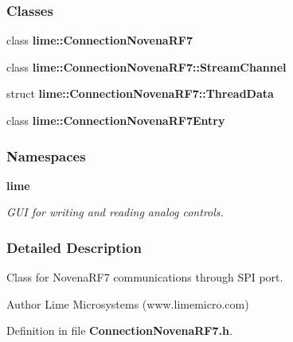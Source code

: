 \subsubsection*{Classes}
\begin{DoxyCompactItemize}
\item 
class {\bf lime\+::\+Connection\+Novena\+R\+F7}
\item 
class {\bf lime\+::\+Connection\+Novena\+R\+F7\+::\+Stream\+Channel}
\item 
struct {\bf lime\+::\+Connection\+Novena\+R\+F7\+::\+Thread\+Data}
\item 
class {\bf lime\+::\+Connection\+Novena\+R\+F7\+Entry}
\end{DoxyCompactItemize}
\subsubsection*{Namespaces}
\begin{DoxyCompactItemize}
\item 
 {\bf lime}
\begin{DoxyCompactList}\small\item\em G\+UI for writing and reading analog controls. \end{DoxyCompactList}\end{DoxyCompactItemize}


\subsubsection{Detailed Description}
Class for Novena\+R\+F7 communications through S\+PI port. 

\begin{DoxyAuthor}{Author}
Lime Microsystems (www.\+limemicro.\+com) 
\end{DoxyAuthor}


Definition in file {\bf Connection\+Novena\+R\+F7.\+h}.

